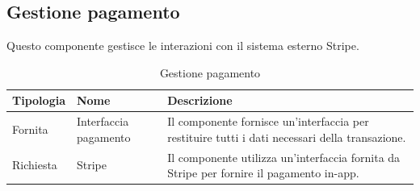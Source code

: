 \subsection{Gestione pagamento}
Questo componente gestisce le interazioni con il sistema esterno Stripe.

\begin{table}[htbp!]
    \centering
    \begin{tabularx}{0.9\textwidth}{ >{\centering\arraybackslash}X | >{\centering\arraybackslash}X | m{8cm}}
        \hline
        \textbf{Tipologia} & \textbf{Nome}  & \textbf{Descrizione}\\
        \hline
        Fornita & Interfaccia pagamento & Il componente fornisce un'interfaccia per restituire tutti i dati necessari della transazione.\\
        \hline
        Richiesta &  Stripe & Il componente utilizza un'interfaccia fornita da Stripe per fornire il pagamento in-app.\\
        \hline    
    \end{tabularx}
    \caption{Gestione pagamento}
    \label{tab:gestione-pagamento}
\end{table}

